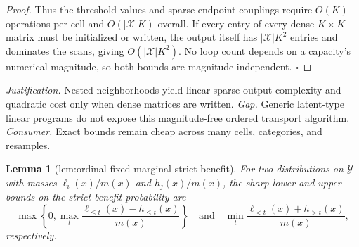 \documentclass{article}
\newtheorem{lemma}{Lemma}
\begin{document}
\begin{proof}
Thus the threshold values and sparse endpoint couplings require
\(O(K)\) operations per cell and \(O(|\mathcal X|K)\) overall.  If every
entry of every dense \(K\times K\) matrix must be initialized or written,
the output itself has \(|\mathcal X|K^2\) entries and dominates the scans,
giving \(O(|\mathcal X|K^2)\).  No loop count depends on a capacity's
numerical magnitude, so both bounds are magnitude-independent. \(\square\)
\end{proof}
\par\smallskip\noindent \textit{Justification.} Nested neighborhoods yield linear sparse-output complexity and quadratic cost only when dense matrices are written. \textit{Gap.} Generic latent-type linear programs do not expose this magnitude-free ordered transport algorithm. \textit{Consumer.} Exact bounds remain cheap across many cells, categories, and resamples.

\begin{lemma}[lem:ordinal-fixed-marginal-strict-benefit]\label{lem:ordinal-fixed-marginal-strict-benefit}
For two distributions on \(\mathcal Y\) with masses \(\ell_i(x)/m(x)\) and \(h_j(x)/m(x)\), the sharp lower and upper bounds on the strict-benefit probability are
\[
\max\left\{0,\max_t\frac{\ell_{\le t}(x)-h_{\le t}(x)}{m(x)}\right\}
\quad\text{and}\quad
\min_t\frac{\ell_{<t}(x)+h_{>t}(x)}{m(x)},
\]
respectively.
\end{lemma}
\end{document}
